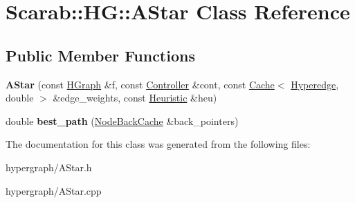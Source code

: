 \hypertarget{classScarab_1_1HG_1_1AStar}{
\section{Scarab::HG::AStar Class Reference}
\label{classScarab_1_1HG_1_1AStar}
}
\subsection*{Public Member Functions}
\begin{DoxyCompactItemize}
\item 
\hypertarget{classScarab_1_1HG_1_1AStar_add1bfbed92beae4cd239af9a150b060b}{
{\bfseries AStar} (const \hyperlink{classScarab_1_1HG_1_1HGraph}{HGraph} \&f, const \hyperlink{classScarab_1_1HG_1_1Controller}{Controller} \&cont, const \hyperlink{classCache}{Cache}$<$ \hyperlink{classScarab_1_1HG_1_1Hyperedge}{Hyperedge}, double $>$ \&edge\_\-weights, const \hyperlink{classScarab_1_1HG_1_1Heuristic}{Heuristic} \&heu)}
\label{classScarab_1_1HG_1_1AStar_add1bfbed92beae4cd239af9a150b060b}

\item 
\hypertarget{classScarab_1_1HG_1_1AStar_a8079591e07aa9c4a5e4e14a5b1acb18b}{
double {\bfseries best\_\-path} (\hyperlink{classCache}{NodeBackCache} \&back\_\-pointers)}
\label{classScarab_1_1HG_1_1AStar_a8079591e07aa9c4a5e4e14a5b1acb18b}

\end{DoxyCompactItemize}


The documentation for this class was generated from the following files:\begin{DoxyCompactItemize}
\item 
hypergraph/AStar.h\item 
hypergraph/AStar.cpp\end{DoxyCompactItemize}
